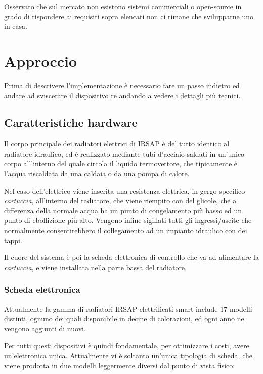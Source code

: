 \documentclass[12pt,a4paper,twoside,titlepage]{book}
\begin{document}
Osservato che sul mercato non esistono sistemi commerciali o open-source in grado di rispondere ai requisiti 
sopra elencati non ci rimane che svilupparne uno in casa. 

\chapter{Approccio}

Prima di descrivere l'implementazione è necessario fare un passo indietro ed andare
ad sviscerare il dispositivo \Gls{re} andando a vedere i dettagli più tecnici.

\section{Caratteristiche hardware}

Il corpo principale dei radiatori elettrici di IRSAP è del tutto identico al radiatore idraulico,
ed è realizzato mediante tubi d'acciaio saldati in un'unico corpo all'interno del quale circola 
il liquido termovettore, che tipicamente è l'acqua riscaldata da una caldaia o da una pompa di calore. 

Nel caso dell'elettrico viene inserita una resistenza elettrica, in gergo specifico \textit{cartuccia},
all'interno del radiatore, che viene riempito con del glicole, che a differenza della normale acqua 
ha un punto di congelamento più basso ed un punto di ebollizione più alto. Vengono infine sigillati 
tutti gli ingressi/uscite che normalmente consentirebbero il collegamento ad un impianto idraulico con dei tappi. 

Il cuore del sistema è poi la scheda elettronica di controllo che va ad alimentare la \textit{cartuccia},
e viene installata nella parte bassa del radiatore. 

\subsection{Scheda elettronica}

Attualmente la gamma di radiatori IRSAP elettrificati smart include 17 modelli distinti, 
ognuno dei quali disponibile in decine di colorazioni, ed ogni anno ne vengono aggiunti di nuovi. 

Per tutti questi dispositivi è quindi fondamentale, per ottimizzare i costi, avere un'elettronica 
unica. Attualmente vi è soltanto un'unica tipologia di scheda, che viene prodotta in due modelli 
leggermente diversi dal punto di vista fisico:
\end{document}
